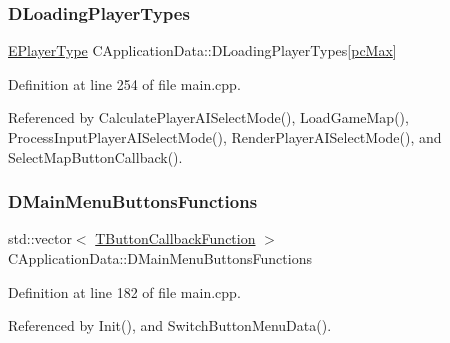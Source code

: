 \subsubsection{\texorpdfstring{D\+Loading\+Player\+Types}{DLoadingPlayerTypes}}
{\footnotesize\ttfamily \hyperlink{classCApplicationData_ae04b6b340297311972ce1e955196fcaa}{E\+Player\+Type} C\+Application\+Data\+::\+D\+Loading\+Player\+Types\mbox{[}\hyperlink{GameDataTypes_8h_aafb0ca75933357ff28a6d7efbdd7602fa594a5c8dd3987f24e8a0f23f1a72cd34}{pc\+Max}\mbox{]}\hspace{0.3cm}{\ttfamily [protected]}}



Definition at line 254 of file main.\+cpp.



Referenced by Calculate\+Player\+A\+I\+Select\+Mode(), Load\+Game\+Map(), Process\+Input\+Player\+A\+I\+Select\+Mode(), Render\+Player\+A\+I\+Select\+Mode(), and Select\+Map\+Button\+Callback().

\hypertarget{classCApplicationData_a9f9c3de6840e902711636257640a8e91}{}\label{classCApplicationData_a9f9c3de6840e902711636257640a8e91} 
\subsubsection{\texorpdfstring{D\+Main\+Menu\+Buttons\+Functions}{DMainMenuButtonsFunctions}}
{\footnotesize\ttfamily std\+::vector$<$ \hyperlink{main_8cpp_af91bc223ea3fea871af009bfef33c595}{T\+Button\+Callback\+Function} $>$ C\+Application\+Data\+::\+D\+Main\+Menu\+Buttons\+Functions\hspace{0.3cm}{\ttfamily [protected]}}



Definition at line 182 of file main.\+cpp.



Referenced by Init(), and Switch\+Button\+Menu\+Data().

\hypertarget{classCApplicationData_a1e1c9f4434847c50210c0b36ff475f78}{}\label{classCApplicationData_a1e1c9f4434847c50210c0b36ff475f78} 
